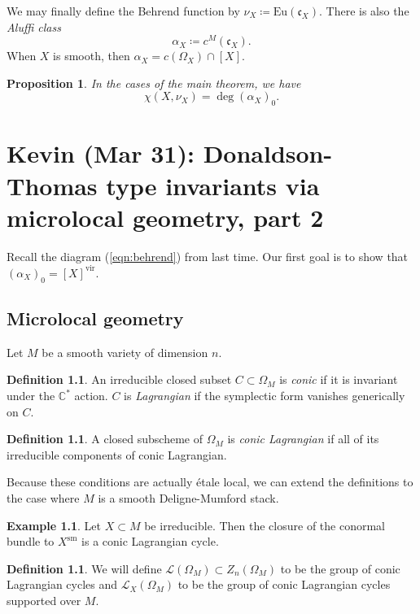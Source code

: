 \documentclass[leqno, openany]{memoir}
\newtheorem{prop}[thm]{Proposition}
\theoremstyle{definition}
\newtheorem{defn}[thm]{Definition}
\newtheorem{exm}[thm]{Example}
\theoremstyle{remark}
\theoremstyle{plain}
\theoremstyle{definition}
\theoremstyle{remark}
\newcommand{\C}{\mathbb{C}}
\newcommand{\mc}[1]{\mathcal{#1}}
\newcommand{\mf}[1]{\mathfrak{#1}}
\newcommand{\mr}[1]{\mathrm{#1}}
\begin{document}
We may finally define the Behrend function by $\nu_X \coloneqq \mr{Eu}(\mf{c}_X)$. There is also the \textit{Aluffi class}
\[ \alpha_X \coloneqq c^M(\mf{c}_X). \]
When $X$ is smooth, then $\alpha_X = c(\Omega_X) \cap [X]$.

\begin{prop}
    In the cases of the main theorem, we have
    \[ \chi(X, \nu_X) = \deg (\alpha_X)_0. \]
\end{prop}

\chapter{Kevin (Mar 31): Donaldson-Thomas type invariants via microlocal geometry, part 2}%

Recall the diagram (\ref{eqn:behrend}) from last time. Our first goal is to show that $(\alpha_X)_0 = [X]^{\mr{vir}}$.

\section{Microlocal geometry}

Let $M$ be a smooth variety of dimension $n$.

\begin{defn}
    An irreducible closed subset $C \subset \Omega_M$ is \textit{conic} if it is invariant under the $\C^*$ action. $C$ is \textit{Lagrangian} if the symplectic form vanishes generically on $C$.
\end{defn}

\begin{defn}
    A closed subscheme of $\Omega_M$ is \textit{conic Lagrangian} if all of its irreducible components of conic Lagrangian.
\end{defn}

Because these conditions are actually \'etale local, we can extend the definitions to the case where $M$ is a smooth Deligne-Mumford stack.

\begin{exm}
    Let $X \subset M$ be irreducible. Then the closure of the conormal bundle to $X^{\mr{sm}}$ is a conic Lagrangian cycle.
\end{exm}

\begin{defn}
    We will define $\mc{L}(\Omega_M) \subset Z_n(\Omega_M)$ to be the group of conic Lagrangian cycles and $\mc{L}_X(\Omega_M)$ to be the group of conic Lagrangian cycles supported over $M$.
\end{defn}
\end{document}
